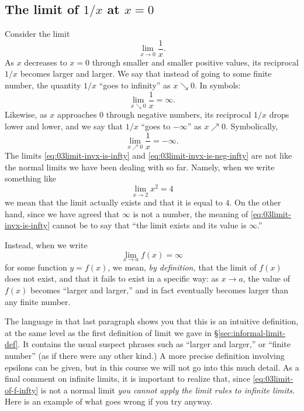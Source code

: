 \subsection{The limit of $1/x$ at $x=0$} 
\label{sec:limit-1x-at-zero}
Consider the limit
\[
\lim_{x\to 0} \frac{1} {x}.
\]
As $x$ decreases to $x=0$ through smaller and smaller positive values,
its reciprocal $1/x$ becomes larger and larger.  We say that instead
of going to some finite number, the quantity $1/x$ ``goes to
infinity'' as $x\searrow0$.  In symbols:
\begin{equation}
  \lim_{x\searrow 0} \frac{1} {x} = \infty.
  \label{eq:03limit-invx-is-infty}  
\end{equation}%
\marginpar{ }%
Likewise, as $x$ approaches $0$ through negative numbers, its
reciprocal $1/x$ drops lower and lower, and we say that $1/x$ ``goes
to $-\infty$'' as $x\nearrow 0$.  Symbolically,
\begin{equation}
  \label{eq:03limit-invx-is-neg-infty}
    \lim_{x\nearrow 0} \frac{1} {x} = -\infty.
\end{equation}
The limits \eqref{eq:03limit-invx-is-infty} and
\eqref{eq:03limit-invx-is-neg-infty} are not like the normal limits we
have been dealing with so far.  Namely, when we write something like
\[
\lim_{x\to2} x^2 = 4
\]
we mean that the limit actually exists and that it is equal to $4$.
On the other hand, since we have agreed that $\infty$ is not a number,
the meaning of \eqref{eq:03limit-invx-is-infty} cannot be to say that
``the limit exists and its value is $\infty$.''

Instead, when we write
\begin{equation}
  \lim_{x\to a} f(x) = \infty
  \label{eq:03limit-of-f-infty}
\end{equation}
for some function $y=f(x)$, we mean, \emph{by definition,} that the
limit of $f(x)$ does not exist, and that it fails to exist in a
specific way: as $x\to a$, the value of $f(x)$ becomes ``larger and
larger,'' and in fact eventually becomes larger than any finite
number.

The language in that last paragraph shows you that this is an
intuitive definition, at the same level as the first definition of
limit we gave in \S\ref{sec:informal-limit-def}.  It contains the
usual suspect phrases such as ``larger and larger,'' or ``finite
number'' (as if there were any other kind.)  A more precise definition
involving epsilons can be given, but in this course we will not go
into this much detail.  As a final comment on infinite limits, it is
important to realize that, since \eqref{eq:03limit-of-f-infty} is not
a normal limit \emph{you cannot apply the limit rules to infinite
  limits. }  Here is an example of what goes wrong if you try anyway.

